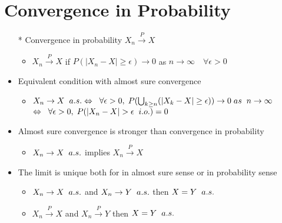 \documentclass[12pt, A4]{article}
\begin{document}
\section{Convergence in Probability}
\begin{itemize}
	\item[*] Convergence in probability $X_n \xrightarrow{P} X$
	\begin{itemize}
		\item $X_n \xrightarrow{P} X$ if $P(|X_n-X|\geq \epsilon)\rightarrow 0$ as $ n\rightarrow \infty \quad \forall \epsilon>0$
	\end{itemize}
	\item Equivalent condition with almost sure convergence
	\begin{itemize}
		\item $X_n \rightarrow X \hspace{0.2cm} a.s. \Leftrightarrow \hspace{0.2cm} \forall \epsilon>0, \hspace{0.1cm} P(\bigcup_{k\geq n}(|X_k-X|\geq \epsilon))\rightarrow 0 \hspace{0.1cm} as \hspace{0.2cm} n\rightarrow \infty$
		\newline $\Leftrightarrow \hspace{0.2cm} \forall \epsilon>0, \hspace{0.1cm} P(|X_n-X|>\epsilon \hspace{0.2cm} i.o.)=0$
	\end{itemize}
	\item Almost sure convergence is stronger than convergence in probability
	\begin{itemize}
		\item $X_n\rightarrow X \hspace{0.2cm} a.s.$ implies $X_n \xrightarrow{P} X$
	\end{itemize}
	\item The limit is unique both for in almost sure sense or in probability sense
	\begin{itemize}
		\item $X_n\rightarrow X \hspace{0.2cm} a.s.$ and $X_n\rightarrow Y \hspace{0.2cm} a.s.$ then $X=Y \hspace{0.2cm} a.s.$
		\item $X_n \xrightarrow{P} X$ and $X_n \xrightarrow{P} Y$ then $X=Y \hspace{0.2cm} a.s.$ 

\end{itemize}
\end{itemize}
\end{document}
